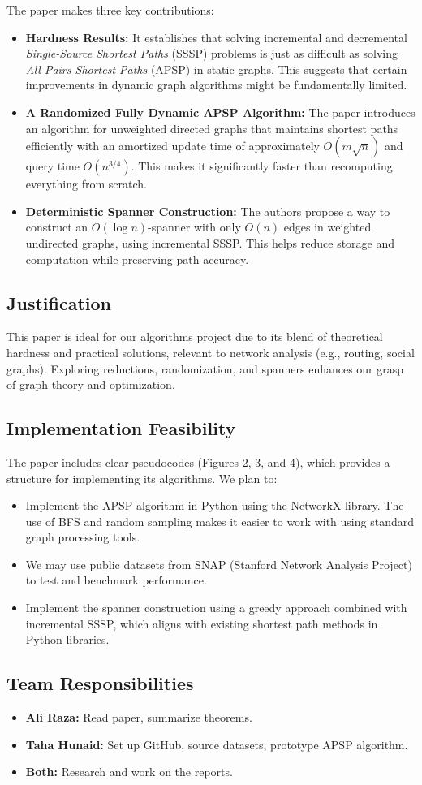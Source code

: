 \documentclass{report}
\begin{document}
The paper makes three key contributions:

\begin{itemize}
    \item \textbf{Hardness Results:} It establishes that solving incremental and decremental \textit{Single-Source Shortest Paths} (SSSP) problems is just as difficult as solving \textit{All-Pairs Shortest Paths} (APSP) in static graphs. This suggests that certain improvements in dynamic graph algorithms might be fundamentally limited.
    
    \item \textbf{A Randomized Fully Dynamic APSP Algorithm:} The paper introduces an algorithm for unweighted directed graphs that maintains shortest paths efficiently with an amortized update time of approximately $O(m\sqrt{n})$ and query time $O(n^{3/4})$. This makes it significantly faster than recomputing everything from scratch.
    
    \item \textbf{Deterministic Spanner Construction:} The authors propose a way to construct an $O(\log n)$-spanner with only $O(n)$ edges in weighted undirected graphs, using incremental SSSP. This helps reduce storage and computation while preserving path accuracy.
\end{itemize}
\subsection*{Justification}
This paper is ideal for our algorithms project due to its blend of theoretical hardness and practical solutions, relevant to network analysis (e.g., routing, social graphs). Exploring reductions, randomization, and spanners enhances our grasp of graph theory and optimization.

\subsection*{Implementation Feasibility}
The paper includes clear pseudocodes (Figures 2, 3, and 4), which provides a structure for implementing its algorithms. We plan to:
\begin{itemize}
    \item Implement the APSP algorithm in Python using the NetworkX library. The use of BFS and random sampling makes it easier to work with using standard graph processing tools.
    
    \item  We may use public datasets from SNAP (Stanford Network Analysis Project) to test and benchmark performance.
    
    \item Implement the spanner construction using a greedy approach combined with incremental SSSP, which aligns with existing shortest path methods in Python libraries.
\end{itemize}


\subsection*{Team Responsibilities}
\begin{itemize}
    \item \textbf{Ali Raza:} Read paper, summarize theorems.
    \item \textbf{Taha Hunaid:} Set up GitHub, source datasets, prototype APSP algorithm.
    \item \textbf{Both:} Research and work on the reports.
    \end{itemize}
\end{document}
